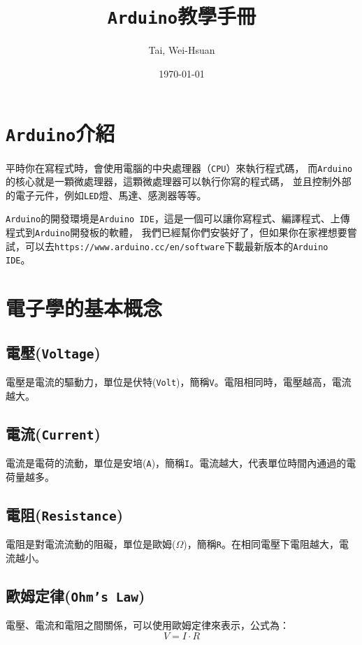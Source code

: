 \documentclass[12pt,a4paper]{article}
\title{\texttt{Arduino}教學手冊}
\author{Tai, Wei-Hsuan}
\date{\today}
\begin{document}
\maketitle

\newpage
\tableofcontents
\newpage

\newpage
\section{\texttt{Arduino}介紹}

平時你在寫程式時，會使用電腦的中央處理器（\texttt{CPU}）來執行程式碼，
而\texttt{Arduino}的核心就是一顆微處理器，這顆微處理器可以執行你寫的程式碼，
並且控制外部的電子元件，例如\texttt{LED}燈、馬達、感測器等等。

\texttt{Arduino}的開發環境是\texttt{Arduino IDE}，這是一個可以讓你寫程式、編譯程式、上傳程式到\texttt{Arduino}開發板的軟體，
我們已經幫你們安裝好了，但如果你在家裡想要嘗試，可以去\texttt{https://www.arduino.cc/en/software}下載最新版本的\texttt{Arduino IDE}。

\section{電子學的基本概念}

\subsection{電壓(\texttt{Voltage})}
電壓是電流的驅動力，單位是伏特(\texttt{Volt})，簡稱\texttt{V}。電阻相同時，電壓越高，電流越大。

\subsection{電流(\texttt{Current})}
電流是電荷的流動，單位是安培(\texttt{A})，簡稱\texttt{I}。電流越大，代表單位時間內通過的電荷量越多。

\subsection{電阻(\texttt{Resistance})}
電阻是對電流流動的阻礙，單位是歐姆($\Omega$)，簡稱\texttt{R}。在相同電壓下電阻越大，電流越小。

\subsection{歐姆定律(\texttt{Ohm's Law})}
電壓、電流和電阻之間關係，可以使用歐姆定律來表示，公式為：
$$
V = I \cdot R
$$
\end{document}
